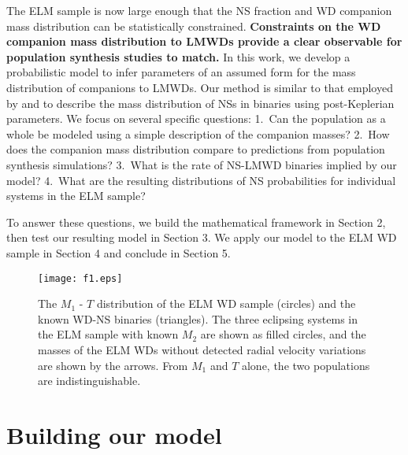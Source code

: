 \documentclass[apjl]{emulateapj}
\newcommand{\period}{T}
\begin{document}
The ELM sample is now large enough that the NS fraction and WD companion mass distribution can be statistically constrained. {\bf Constraints on the WD companion mass distribution to LMWDs provide a clear observable for population synthesis studies to match.} In this work, we develop a probabilistic model to infer parameters of an assumed form for the mass distribution of companions to LMWDs. Our method is similar to that employed by \citet{ozel12} and \citet{kiziltan13} to describe the mass distribution of NSs in binaries using post-Keplerian parameters. We focus on several specific questions: 1.\ Can the population as a whole be modeled using a simple description of the companion masses? 2.\ How does the companion mass distribution compare to predictions from population synthesis simulations?  3.\ What is the rate of NS-LMWD binaries implied by our model? 4.\ What are the resulting distributions of NS probabilities for individual systems in the ELM sample? 


To answer these questions, we build the mathematical framework in Section 2, then test our resulting model in Section 3. We apply our model to the ELM WD sample in Section 4 and conclude in Section 5.

\begin{figure}[h!]
\begin{center}
\texttt{[image: f1.eps]}
\caption{The $M_1$ - $\period$ distribution of the ELM WD sample (circles) and the known WD-NS binaries (triangles). The three eclipsing systems in the ELM sample with known $M_2$ are shown as filled circles, and the masses of the ELM WDs without detected radial velocity variations are shown by the arrows. From $M_1$ and $\period$ alone, the two populations are indistinguishable.}
\label{fig:Porb-M1}
\end{center}
\end{figure}




\section{Building our model}
\end{document}
